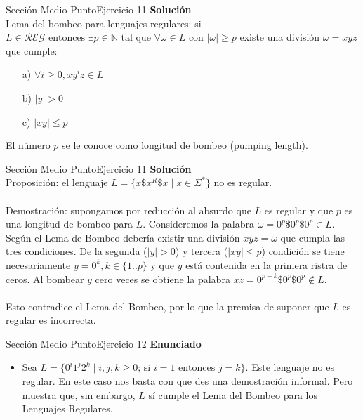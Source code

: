 \documentclass[10pt, envcountsect, presentation, aspectratio=169]{beamer}
\begin{document}

\begin{frame}{Sección Medio Punto}{Ejercicio 11}
    \textbf{Solución}\\
    Lema del bombeo para lenguajes regulares: si $L \in \mathcal{REG} \text{ entonces } \exists p \in \mathbb{N} \text{ tal que } \forall \omega \in L \text{ con}$
    $|\omega| \geq p$ existe una división $\omega = xyz$ que cumple:
    \begin{itemize}
        \item[a)] $\forall i \geq 0, xy^iz \in L$
        \item[b)] $|y| > 0$
        \item[c)] $|xy| \leq p$  
    \end{itemize}
    El número $p$ se le conoce como longitud de bombeo (pumping length).
\end{frame}


\begin{frame}{Sección Medio Punto}{Ejercicio 11}
    \textbf{Solución}\\
    Proposición: el lenguaje $L=\{x\$x^R\$x \mid x \in \Sigma^*\}$ no es regular.\\~\\

    Demostración: supongamos por reducción al absurdo que $L$ es regular y que $p$ es una longitud de bombeo para $L$. 
    Consideremos la palabra $\omega = 0^p\$0^p\$0^p \in L$.\\
    Según el Lema de Bombeo debería existir una división $xyz=\omega$
    que cumpla las tres condiciones. De la segunda ($|y|>0$) y tercera ($|xy| \leq p$) condición se tiene necesariamente $y=0^k, k \in \{1..p\}$ y que $y$ está contenida en la primera ristra de ceros.
    Al bombear $y$ cero veces se obtiene la palabra $xz = 0^{p-k}\$0^p\$0^p \notin L$.\\~\\
    Esto contradice el Lema del Bombeo, por lo que la premisa de suponer que $L$ es regular es incorrecta. 

\end{frame}


\begin{frame}{Sección Medio Punto}{Ejercicio 12}
    \textbf{Enunciado}
    \begin{itemize}
        \item Sea $L= \{ 0^i 1^j 2^k \mid i,j,k \geq0 \mbox{; si } i=1 \mbox{ entonces } j=k \} $. Este lenguaje no es regular. En este caso nos basta con que des una  demostración informal. Pero muestra que, sin embargo,  $L$ sí cumple el Lema del Bombeo para los Lenguajes Regulares.
    \end{itemize}
\end{frame}
\end{document}
